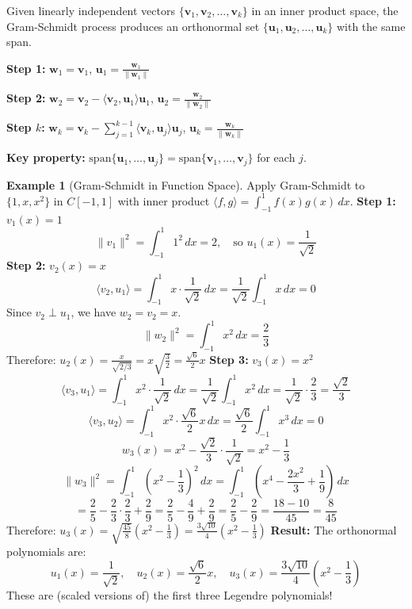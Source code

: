 \documentclass[12pt]{article}
\numberwithin{equation}{section}
\newcommand{\vect}[1]{\boldsymbol{#1}}   %
\theoremstyle{plain}
\theoremstyle{definition}
\newtheorem{example}[theorem]{Example}
\theoremstyle{remark}
\begin{document}
\begin{algorithm}[H]
\caption{Gram-Schmidt Process}
Given linearly independent vectors $\{\vect{v}_1, \vect{v}_2, \ldots, \vect{v}_k\}$ in an inner product space, the Gram-Schmidt process produces an orthonormal set $\{\vect{u}_1, \vect{u}_2, \ldots, \vect{u}_k\}$ with the same span.

\textbf{Step 1:} $\vect{w}_1 = \vect{v}_1$, $\vect{u}_1 = \frac{\vect{w}_1}{\|\vect{w}_1\|}$

\textbf{Step 2:} $\vect{w}_2 = \vect{v}_2 - \langle \vect{v}_2, \vect{u}_1 \rangle \vect{u}_1$, $\vect{u}_2 = \frac{\vect{w}_2}{\|\vect{w}_2\|}$

\textbf{Step $k$:} $\vect{w}_k = \vect{v}_k - \sum_{j=1}^{k-1} \langle \vect{v}_k, \vect{u}_j \rangle \vect{u}_j$, $\vect{u}_k = \frac{\vect{w}_k}{\|\vect{w}_k\|}$

\textbf{Key property:} $\text{span}\{\vect{u}_1, \ldots, \vect{u}_j\} = \text{span}\{\vect{v}_1, \ldots, \vect{v}_j\}$ for each $j$.
\end{algorithm}

\begin{example}[Gram-Schmidt in Function Space]
Apply Gram-Schmidt to $\{1, x, x^2\}$ in $C[-1,1]$ with inner product $\langle f, g \rangle = \int_{-1}^1 f(x)g(x) \, dx$.
\textbf{Step 1:} $v_1(x) = 1$
$$\|v_1\|^2 = \int_{-1}^1 1^2 \, dx = 2, \quad \text{so } u_1(x) = \frac{1}{\sqrt{2}}$$
\textbf{Step 2:} $v_2(x) = x$
$$\langle v_2, u_1 \rangle = \int_{-1}^1 x \cdot \frac{1}{\sqrt{2}} \, dx = \frac{1}{\sqrt{2}} \int_{-1}^1 x \, dx = 0$$
Since $v_2 \perp u_1$, we have $w_2 = v_2 = x$.
$$\|w_2\|^2 = \int_{-1}^1 x^2 \, dx = \frac{2}{3}$$
Therefore: $u_2(x) = \frac{x}{\sqrt{2/3}} = x \sqrt{\frac{3}{2}} = \frac{\sqrt{6}}{2} x$
\textbf{Step 3:} $v_3(x) = x^2$
$$\langle v_3, u_1 \rangle = \int_{-1}^1 x^2 \cdot \frac{1}{\sqrt{2}} \, dx = \frac{1}{\sqrt{2}} \int_{-1}^1 x^2 \, dx = \frac{1}{\sqrt{2}} \cdot \frac{2}{3} = \frac{\sqrt{2}}{3}$$
$$\langle v_3, u_2 \rangle = \int_{-1}^1 x^2 \cdot \frac{\sqrt{6}}{2} x \, dx = \frac{\sqrt{6}}{2} \int_{-1}^1 x^3 \, dx = 0$$
$$w_3(x) = x^2 - \frac{\sqrt{2}}{3} \cdot \frac{1}{\sqrt{2}} = x^2 - \frac{1}{3}$$
$$\|w_3\|^2 = \int_{-1}^1 \left(x^2 - \frac{1}{3}\right)^2 \, dx = \int_{-1}^1 \left(x^4 - \frac{2x^2}{3} + \frac{1}{9}\right) \, dx$$
$$= \frac{2}{5} - \frac{2}{3} \cdot \frac{2}{3} + \frac{2}{9} = \frac{2}{5} - \frac{4}{9} + \frac{2}{9} = \frac{2}{5} - \frac{2}{9} = \frac{18-10}{45} = \frac{8}{45}$$
Therefore: $u_3(x) = \sqrt{\frac{45}{8}} \left(x^2 - \frac{1}{3}\right) = \frac{3\sqrt{10}}{4} \left(x^2 - \frac{1}{3}\right)$
\textbf{Result:} The orthonormal polynomials are:
$$u_1(x) = \frac{1}{\sqrt{2}}, \quad u_2(x) = \frac{\sqrt{6}}{2} x, \quad u_3(x) = \frac{3\sqrt{10}}{4} \left(x^2 - \frac{1}{3}\right)$$
These are (scaled versions of) the first three Legendre polynomials!
\end{example}
\end{document}
